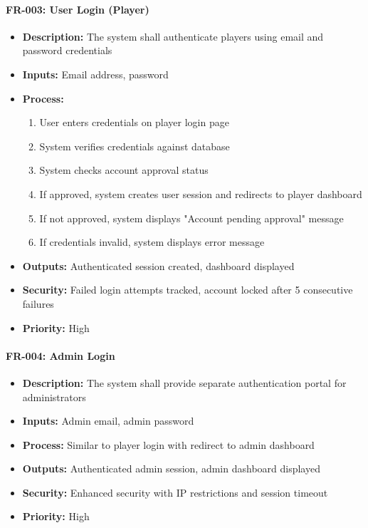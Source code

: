 \documentclass[12pt,a4paper]{article}
\begin{document}
\begin{enumerate}
\paragraph{FR-003: User Login (Player)}
\begin{itemize}
    \item \textbf{Description:} The system shall authenticate players using email and password credentials
    \item \textbf{Inputs:} Email address, password
    \item \textbf{Process:}
    \begin{enumerate}
        \item User enters credentials on player login page
        \item System verifies credentials against database
        \item System checks account approval status
        \item If approved, system creates user session and redirects to player dashboard
        \item If not approved, system displays "Account pending approval" message
        \item If credentials invalid, system displays error message
    \end{enumerate}
    \item \textbf{Outputs:} Authenticated session created, dashboard displayed
    \item \textbf{Security:} Failed login attempts tracked, account locked after 5 consecutive failures
    \item \textbf{Priority:} High
\end{itemize}

\paragraph{FR-004: Admin Login}
\begin{itemize}
    \item \textbf{Description:} The system shall provide separate authentication portal for administrators
    \item \textbf{Inputs:} Admin email, admin password
    \item \textbf{Process:} Similar to player login with redirect to admin dashboard
    \item \textbf{Outputs:} Authenticated admin session, admin dashboard displayed
    \item \textbf{Security:} Enhanced security with IP restrictions and session timeout
    \item \textbf{Priority:} High
\end{itemize}


\end{enumerate}
\end{document}
